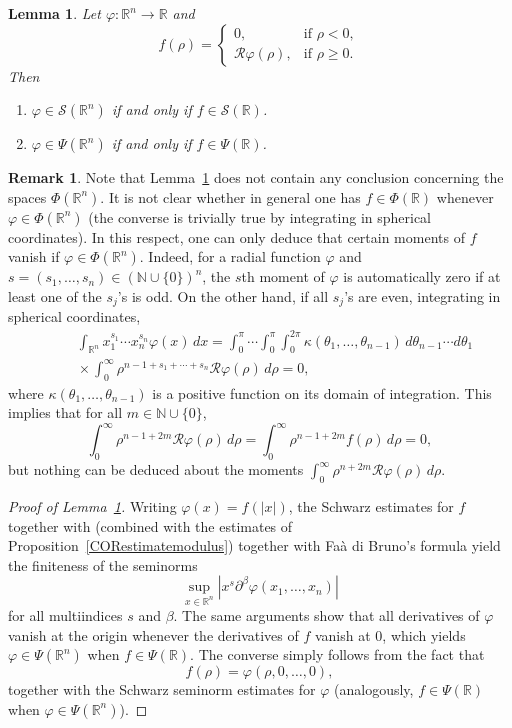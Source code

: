 \documentclass[reqno,11pt]{amsart}
\newtheorem{lemma}[theorem]{Lemma}
\theoremstyle{definition}
\newtheorem{remark}[theorem]{Remark}
\def\R{\mathbb{R}}
\begin{document}
\begin{lemma}
	\label{LEMradial}
	Let $\varphi\colon\R^n\to \R$ and
	\[
	f(\rho) = \begin{cases}
		0,&\text{if } \rho<0,\\
		\mathcal{R}\varphi(\rho),&\text{if }\rho\geq 0.
	\end{cases}
	\]
	Then
	\begin{enumerate}[label=\textnormal{(\roman{*})}]
		\item $\varphi\in \mathcal{S}(\R^n)$ if and only if $f\in \mathcal{S}(\R)$.
		\item $\varphi\in \Psi(\R^n)$ if and only if $f\in \Psi(\R)$.
	\end{enumerate}
\end{lemma}
\begin{remark}
	Note that Lemma~\ref{LEMradial} does not contain any conclusion concerning the spaces $\Phi(\R^n)$. It is not clear whether in general one has $f\in \Phi(\R)$ whenever $\varphi\in \Phi(\R^n)$ (the converse is trivially true by integrating in spherical coordinates). In this respect, one can only deduce that certain moments of $f$ vanish if $\varphi\in \Phi(\R^n)$. Indeed, for a radial function $\varphi$ and $s=(s_1,\ldots , s_n)\in (\mathbb{N}\cup\{0\})^n$, the $s$th moment of $\varphi$ is automatically zero if at least one of the $s_j$'s is odd. On the other hand, if all $s_j$'s are even, integrating in spherical coordinates,
	\begin{align*}
		&\phantom{=}\int_{\R^n}x_1^{s_1}\cdots x_n^{s_n}\varphi(x)\, dx = \int_0^\pi \cdots \int_0^{\pi}\int_0^{2\pi}  \kappa(\theta_1,\ldots , \theta_{n-1}) \, d\theta_{n-1}\cdots d\theta_1 \\
		&\phantom{=}\times \int_0^\infty \rho^{n-1+s_1+\cdots +s_n} \mathcal{R}\varphi(\rho)\, d\rho=0,
	\end{align*}
	where $\kappa(\theta_1,\ldots , \theta_{n-1})$ is a positive function on its domain of integration. This implies that for all $m\in \mathbb{N}\cup\{0\}$,
	\[
	\int_0^\infty \rho^{n-1+2m} \mathcal{R}\varphi(\rho)\, d\rho=  \int_0^\infty \rho^{n-1+2m} f(\rho)\, d\rho=0,
	\]
	but nothing can be deduced about the moments $\int_0^\infty \rho^{n+2m} \mathcal{R}\varphi(\rho)\, d\rho$.
\end{remark}
\begin{proof}[Proof of Lemma~\ref{LEMradial}]
	Writing $\varphi(x) = f(|x|)$, the Schwarz estimates for $f$ together with  (combined with the estimates of Proposition~\ref{CORestimatemodulus}) together with Faà di Bruno's formula \cite[Ch. 1]{KS} yield the finiteness of the seminorms
	\[
	\sup_{x\in \R^n}|x^s \partial^{\beta}\varphi(x_1,\ldots , x_n)|
	\]
	for all multiindices $s$ and $\beta$. The same arguments show that all derivatives of $\varphi$ vanish at the origin whenever the derivatives of $f$ vanish at $0$, which yields $\varphi\in\Psi(\R^n)$ when $f\in\Psi(\R)$. The converse simply follows from the fact that
	\[
	f(\rho) = \varphi(\rho,0,\ldots  , 0),
	\]
	together with the Schwarz seminorm estimates for $\varphi$ (analogously, $f\in\Psi(\R)$ when $\varphi\in\Psi(\R^n)$).
\end{proof}
\end{document}
